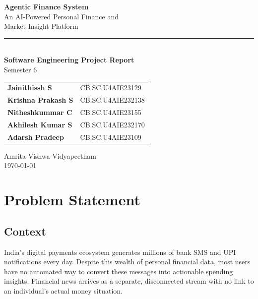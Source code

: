 \documentclass[12pt,a4paper]{article}
\begin{document}
\begin{titlepage}
\centering
\vspace*{2cm}

{\Huge\bfseries Agentic Finance System}\\[0.6cm]
{\Large An AI-Powered Personal Finance and\\Market Insight Platform}\\[1.2cm]

\rule{0.6\textwidth}{0.4pt}\\[1.4cm]

{\large\textbf{Software Engineering Project Report}}\\[0.3cm]
{\large Semester 6}\\[2cm]

\begin{tabular}{l l}
\textbf{Jainithissh S}       & CB.SC.U4AIE23129  \\[4pt]
\textbf{Krishna Prakash S}   & CB.SC.U4AIE232138 \\[4pt]
\textbf{Nitheshkummar C}     & CB.SC.U4AIE23155  \\[4pt]
\textbf{Akhilesh Kumar S}    & CB.SC.U4AIE232170 \\[4pt]
\textbf{Adarsh Pradeep}      & CB.SC.U4AIE23109  \\
\end{tabular}

\vfill
{\large Amrita Vishwa Vidyapeetham}\\[0.3cm]
{\large \today}
\end{titlepage}

\tableofcontents
\newpage

\section{Problem Statement}

\subsection{Context}
India's digital payments ecosystem generates millions of bank SMS and UPI notifications every day. Despite this wealth of personal financial data, most users have no automated way to convert these messages into actionable spending insights. Financial news arrives as a separate, disconnected stream with no link to an individual's actual money situation.
\end{document}
